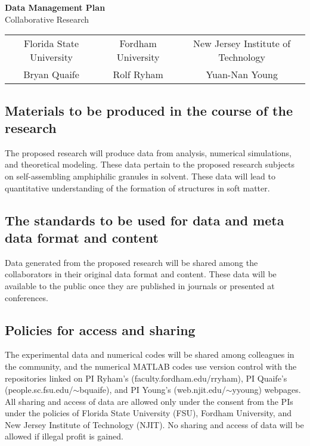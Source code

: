 \documentclass[11pt]{article}
\begin{document}
\sloppy

\begin{center}
{\Large \bf Data Management Plan}\\
Collaborative Research
\begin{tabular}{ccc}\\ 
  Florida State University & Fordham University & New Jersey Institute
  of Technology\\
  Bryan Quaife & Rolf Ryham & Yuan-Nan Young
\end{tabular}
\end{center}

\subsection*{Materials to be produced in the course of the research}
The proposed research will produce data from analysis, numerical
simulations, and theoretical modeling. These data pertain to the
proposed research subjects on self-assembling amphiphilic granules in
solvent. These data will lead to quantitative understanding of the
formation of structures in soft matter.

\subsection*{The standards to be used for data and meta data format and
content}
Data generated from the proposed research will be shared among the
collaborators in their original data format and content. These data will
be available to the public once they are published in journals or
presented at conferences.

\subsection*{Policies for access and sharing}
The experimental data and numerical codes will be shared among
colleagues in the community, and the numerical MATLAB codes use version
control with the repositories linked on PI Ryham's
(faculty.fordham.edu/rryham), PI Quaife's
(people.sc.fsu.edu/$\sim$bquaife), and PI Young's
(web.njit.edu/$\sim$yyoung) webpages. All sharing and access of data are
allowed only under the consent from the PIs under the policies of
Florida State University (FSU), Fordham University, and New Jersey
Institute of Technology (NJIT). No sharing and access of data will be
allowed if illegal profit is gained.
\end{document}
